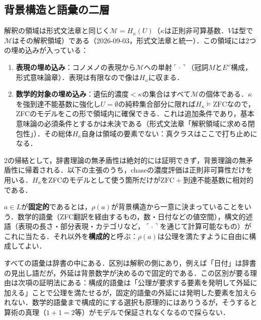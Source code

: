 \documentclass[../../main-detail.tex]{subfiles}
\begin{document}
\subsection{背景構造と語彙の二層}
解釈の領域は形式文法章と同じく$\mathcal{M} = H_\kappa(U)$（$\kappa$は正則非可算基数．$V$は型で$\mathcal{M}$はその解釈領域）である（2026-09-03，形式文法章と統一）．この領域には2つの埋め込みが入っている：
\begin{enumerate}
    \item \textbf{表現の埋め込み}：コノメノの表現から$\mathcal{M}$への単射$\ulcorner\cdot\urcorner$（冠詞$M$と$E^\omega$構成，形式意味論章）．表現は有限なので像は$H_\omega$に収まる．
    \item \textbf{数学的対象の埋め込み}：遺伝的濃度$<\kappa$の集合はすべて$\mathcal{M}$の個体である．$\kappa$を強到達不能基数に強化し$U=\emptyset$の純粋集合部分に限れば$H_\kappa \models \mathrm{ZFC}$なので，ZFCのモデルをこの形で領域内に確保できる．これは追加条件であり，基本意味論の必須条件とするかは未決である（形式文法章「解釈領域に求める閉包性」）．その総体$H_\kappa$自身は領域の要素でない：真クラスはここで打ち止めになる．
\end{enumerate}
2の帰結として，辞書理論の無矛盾性は絶対的には証明できず，背景理論の無矛盾性に帰着される．以下の主張のうち，chaseの濃度評価は正則非可算性だけを用いる．$H_\kappa$をZFCのモデルとして使う箇所だけが$\mathrm{ZFC}+\text{到達不能基数}$に相対的である．

\begin{definition}
    $a \in L$が\textbf{固定的}であるとは，$\rho(a)$が背景構造から一意に決まっていることをいう．数学的語彙（ZFC翻訳を経由するもの，数・日付などの値空間），構文的述語（表現の長さ・部分表現・カテゴリなど，$\ulcorner\cdot\urcorner$を通じて計算可能なもの）がこれに当たる．それ以外を\textbf{構成的}と呼ぶ：$\rho(a)$は公理を満たすように自由に構成してよい．
\end{definition}
\begin{remark}
    すべての語彙は辞書の中にある．区別は解釈の側にあり，例えば「日付」は辞書の見出し語だが，外延は背景数学が決めるので固定的である．この区別が要る理由は次項の証明法にある：構成的語彙は「公理が要求する要素を発明して外延に加える」ことで公理を満たせるが，固定的語彙の外延には発明した要素を加えられない．数学的語彙まで構成的にする選択も原理的にはありうるが，そうすると算術の真理（$1+1=2$等）がモデルで保証されなくなるので採らない．
\end{remark}
\end{document}
